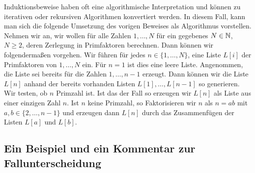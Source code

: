 \begin{bem}
	Induktionsbeweise haben oft eine algorithmische Interpretation und können zu iterativen oder rekursiven Algorithmen konvertiert werden. In diesem Fall, kann man sich die folgende Umsetzung des vorigen Beweises als Algorithmus vorstellen. Nehmen wir an, wir wollen für alle Zahlen $1,\ldots,N$ für ein gegebenes $N \in \mathbb{N}$, $N \ge 2$, deren Zerlegung in Primfaktoren berechnen. Dann können wir folgendermaßen vorgehen. Wir führen für jedes $n \in \{1,\ldots,N\}$, eine Liste $L[i]$ der Primfaktoren von $1,\ldots,N$ ein. Für $n=1$ ist dies eine leere Liste. Angenommen, die Liste sei bereits für die Zahlen $1,\ldots,n-1$ erzeugt. Dann können wir die Liste $L[n]$ anhand der bereits vorhanden Listen $L[1],\ldots,L[n-1]$ so generieren. Wir testen, ob $n$ Primzahl ist. Ist das der Fall so erzeugen wir $L[n]$ als Liste aus einer einzigen Zahl $n$. Ist $n$ keine Primzahl, so Faktorisieren wir $n$ als $n = ab$ mit $a,b \in \{2,\ldots,n-1\}$ und erzeugen dann $L[n]$ durch das Zusammenfügen der Listen $L[a]$ und $L[b]$. 
	
	
	
\end{bem} 

\subsection{Ein Beispiel und ein Kommentar zur Fallunterscheidung} 

